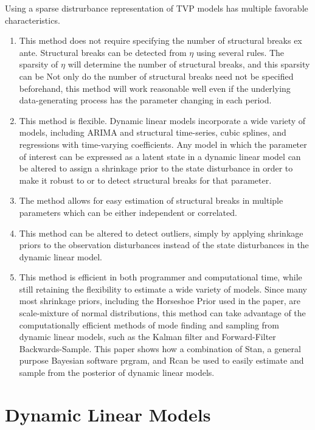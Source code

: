 \documentclass{article}
\newcommand{\RLang}{\textsf{R}}
\newcommand{\Stan}{Stan}
\begin{document}
Using a sparse distrurbance representation of TVP models has multiple favorable characteristics.
\begin{enumerate}
\item This method does not require specifying the number of structural breaks ex ante.
Structural breaks can be detected from $\eta$ using several rules.
The sparsity of $\eta$ will determine the number of structural breaks, and this sparsity can be 
Not only do the number of structural breaks need not be specified beforehand, this method will work reasonable well even if the underlying data-generating process has the parameter changing in each period.
\item This method is flexible.
Dynamic linear models incorporate a wide variety of models, including ARIMA and structural time-series, cubic splines, and regressions with time-varying coefficients.
Any model in which the parameter of interest can be expressed as a latent state in a dynamic linear model can be altered to assign a shrinkage prior to the state disturbance in order to make it robust to or to detect structural breaks for that parameter.
\item The method allows for easy estimation of structural breaks in multiple parameters which can be either independent or correlated.
\item This method can be altered to detect outliers, simply by applying shrinkage priors to the observation disturbances instead of the state disturbances in the dynamic linear model.
\item This method is efficient in both programmer and computational time, while still retaining the flexibility to estimate a wide variety of models.
Since many most shrinkage priors, including the Horseshoe Prior used in the paper, are scale-mixture of normal distributions, this method can take advantage of the computationally efficient methods of mode finding and sampling from dynamic linear models, such as the Kalman filter and Forward-Filter Backwards-Sample.
This paper shows how a combination of \Stan, a general purpose Bayesian software prgram, and \RLang can be used to easily estimate and sample from the posterior of dynamic linear models.
\end{enumerate}

\section{Dynamic Linear Models}
\label{sec:dynam-line-models}
\end{document}

